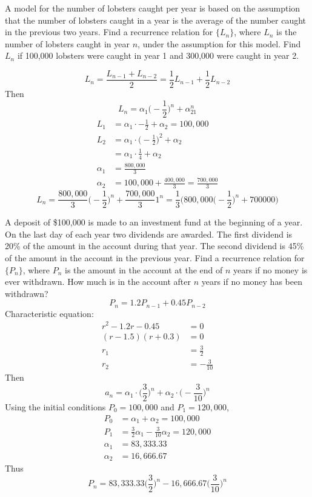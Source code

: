 \documentclass[12pt]{article}
\begin{document}
\begin{example} A model for the number of lobsters caught per year is based on the assumption that the number of lobsters caught in a year is the average of the number caught in the previous two years. Find a recurrence relation for $\{L_n\}$, where $L_n$ is the number of lobsters caught in year $n$, under the assumption for this model. Find $L_n$ if 100,000 lobsters were caught in year 1 and 300,000 were caught in year 2. 

$$ L_n = \frac{L_{n - 1} + L_{n - 2}}{2} = \frac{1}{2}L_{n - 1} + \frac{1}{2}L_{n - 2} $$
Then $$L_n =\alpha_1\Big(-\frac{1}{2}\Big)^n + \alpha_21^n $$
$$\begin{aligned} L_1 &= \alpha_1 \cdot -\frac{1}{2} + \alpha_2 = 100,000 \\ L_2 &= \alpha_1 \cdot \Big(-\frac{1}{2}\Big)^2 + \alpha_2 \\ &= \alpha_1 \cdot \frac{1}{4} + \alpha_2 \\ \alpha_1 &= \frac{800,000}{3} \\ \alpha_2 &= 100,000 + \frac{400,000}{3} = \frac{700, 000}{3} \end{aligned} $$ 
$$L_n = \frac{800,000}{3}\Big(-\frac{1}{2}\Big)^n + \frac{700,000}{3}1^n = \frac{1}{3}\Big(800,000\Big(-\frac{1}{2}\Big)^n + 700000\Big) $$ \end{example} 

\begin{example} A deposit of \$100,000 is made to an investment fund at the beginning of a year. On the last day of each year two dividends are awarded. The first dividend is 20\% of the amount in the account during that year. The second dividend is 45\% of the amount in the account in the previous year. Find a recurrence relation for $\{P_n\}$, where $P_n$ is the amount in the account at the end of $n$ years if no money is ever withdrawn. How much is in the account after $n$ years if no money has been withdrawn? 
$$ P_n = 1.2P_{n - 1} + 0.45P_{n - 2} $$ 
Characteristic equation: $$\begin{aligned} r^2 - 1.2r - 0.45 &= 0 \\ (r - 1.5)(r + 0.3) &= 0 \\ r_1 &= \frac{3}{2} \\ r_2 &= -\frac{3}{10} \end{aligned} $$
Then $$a_n = \alpha_1 \cdot \Big(\frac{3}{2}\Big)^n + \alpha_2 \cdot \Big(-\frac{3}{10}\Big)^n $$ 
Using the initial conditions $P_0 = 100,000$ and $P_1 = 120,000$, $$\begin{aligned} 
P_0 &= \alpha_1 + \alpha_2 = 100,000 \\ P_1 &= \frac{3}{2}\alpha_1 - \frac{3}{10}\alpha_2 = 120,000 \\ \alpha_1 &= 83,333.33 \\ \alpha_2 &= 16,666.67 \end{aligned} $$ 
Thus $$P_n = 83,333.33\Big(\frac{3}{2}\Big)^n - 16,666.67\Big(\frac{3}{10}\Big)^n $$ \end{example}
\end{document}
